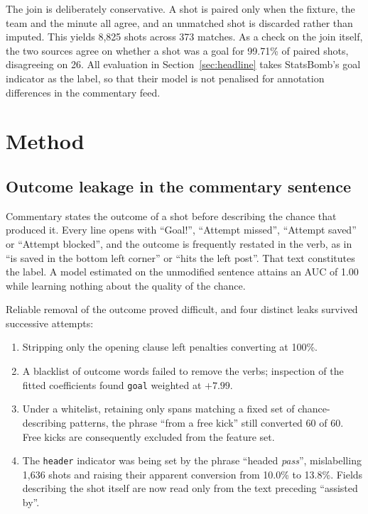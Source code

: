 \documentclass[conference]{IEEEtran}
\newcommand{\num}[1]{\mbox{#1}}
\begin{document}
The join is deliberately conservative. A shot is paired only when the fixture,
the team and the minute all agree, and an unmatched shot is discarded rather
than imputed. This yields \num{8,825} shots across 373 matches. As a check on
the join itself, the two sources agree on whether a shot was a goal for
99.71\% of paired shots, disagreeing on 26. All evaluation in
Section~\ref{sec:headline} takes StatsBomb's goal indicator as the label, so
that their model is not penalised for annotation differences in the commentary
feed.

\section{Method}

\subsection{Outcome leakage in the commentary sentence}
\label{sec:leak}

Commentary states the outcome of a shot before describing the chance that
produced it. Every line opens with ``Goal!'', ``Attempt missed'', ``Attempt
saved'' or ``Attempt blocked'', and the outcome is frequently restated in the
verb, as in ``is saved in the bottom left corner'' or ``hits the left post''.
That text constitutes the label. A model estimated on the unmodified sentence
attains an AUC of \num{1.00} while learning nothing about the quality of the
chance.

Reliable removal of the outcome proved difficult, and four distinct leaks
survived successive attempts:

\begin{enumerate}
\item Stripping only the opening clause left penalties converting at 100\%.
\item A blacklist of outcome words failed to remove the verbs; inspection of
the fitted coefficients found \texttt{goal} weighted at $+7.99$.
\item Under a whitelist, retaining only spans matching a fixed set of
chance-describing patterns, the phrase ``from a free kick'' still converted 60
of 60. Free kicks are consequently excluded from the feature set.
\item The \texttt{header} indicator was being set by the phrase ``headed
\emph{pass}'', mislabelling \num{1,636} shots and raising their apparent
conversion from 10.0\% to 13.8\%. Fields describing the shot itself are now
read only from the text preceding ``assisted by''.
\end{enumerate}
\end{document}
